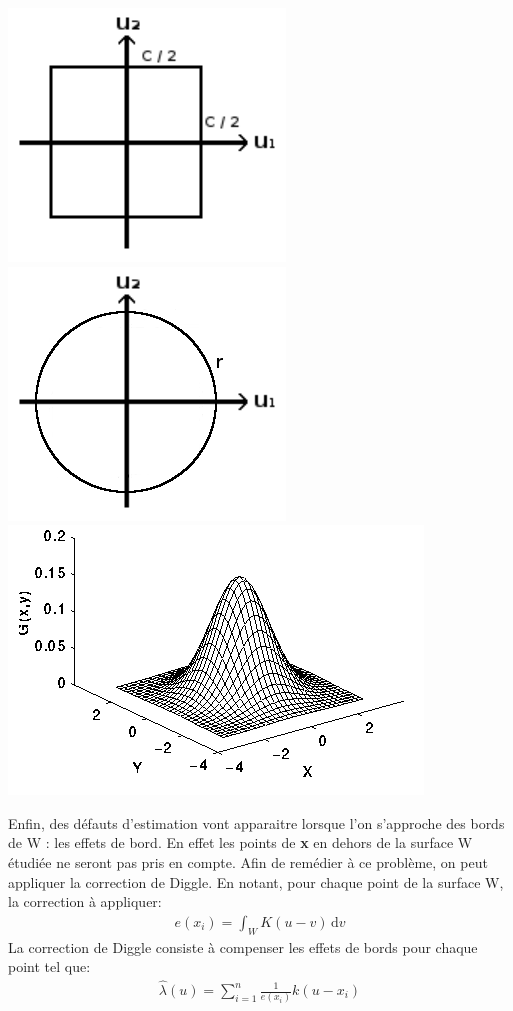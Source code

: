 \documentclass[stage2a]{tnreport}
\begin{document}
\begin{minipage}{0.35\linewidth}
\includegraphics[scale=0.3]{figures/carre.png}\\
\includegraphics[scale=0.3]{figures/rond.png}
\includegraphics[scale=0.3]{figures/gaussien.png}
\end{minipage}


Enfin, des défauts d'estimation vont apparaitre lorsque l'on s'approche des bords de W : les effets de bord. En effet les points de \textbf{x} en dehors de la surface W étudiée ne seront pas pris en compte. Afin de remédier à ce problème, on peut appliquer la correction de Diggle. En notant, pour chaque point de la surface W, la correction à appliquer:
\begin{align*}
e(x_i) = \int_W K(u-v) \, \mathrm dv 
\end{align*} 
La correction de Diggle consiste à compenser les effets de bords pour chaque point tel que: 
\begin{align*}
    \hat{\lambda}(u) = \sum_{i=1}^n \frac{1}{e(x_i)} k(u-x_i)
\end{align*}
\end{document}
